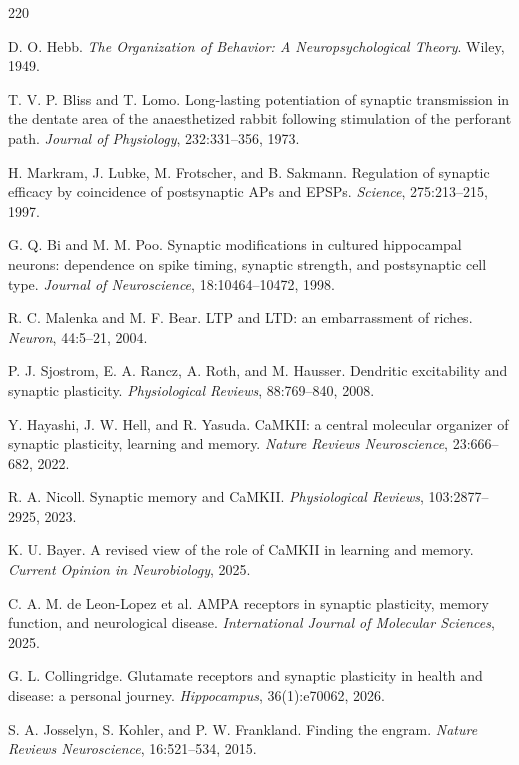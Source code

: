 \documentclass[11pt]{article}
\newcommand{\1}{\mathbf{1}}
\begin{document}
\newpage
\begin{thebibliography}{220}

D. O. Hebb. \emph{The Organization of Behavior: A Neuropsychological Theory}. Wiley, 1949.

T. V. P. Bliss and T. Lomo. Long-lasting potentiation of synaptic transmission in the dentate area of the anaesthetized rabbit following stimulation of the perforant path. \emph{Journal of Physiology}, 232:331--356, 1973.

H. Markram, J. Lubke, M. Frotscher, and B. Sakmann. Regulation of synaptic efficacy by coincidence of postsynaptic APs and EPSPs. \emph{Science}, 275:213--215, 1997.

G. Q. Bi and M. M. Poo. Synaptic modifications in cultured hippocampal neurons: dependence on spike timing, synaptic strength, and postsynaptic cell type. \emph{Journal of Neuroscience}, 18:10464--10472, 1998.

R. C. Malenka and M. F. Bear. LTP and LTD: an embarrassment of riches. \emph{Neuron}, 44:5--21, 2004.

P. J. Sjostrom, E. A. Rancz, A. Roth, and M. Hausser. Dendritic excitability and synaptic plasticity. \emph{Physiological Reviews}, 88:769--840, 2008.

Y. Hayashi, J. W. Hell, and R. Yasuda. CaMKII: a central molecular organizer of synaptic plasticity, learning and memory. \emph{Nature Reviews Neuroscience}, 23:666--682, 2022.

R. A. Nicoll. Synaptic memory and CaMKII. \emph{Physiological Reviews}, 103:2877--2925, 2023.

K. U. Bayer. A revised view of the role of CaMKII in learning and memory. \emph{Current Opinion in Neurobiology}, 2025.

C. A. M. de Leon-Lopez et al. AMPA receptors in synaptic plasticity, memory function, and neurological disease. \emph{International Journal of Molecular Sciences}, 2025.

G. L. Collingridge. Glutamate receptors and synaptic plasticity in health and disease: a personal journey. \emph{Hippocampus}, 36(1):e70062, 2026.

S. A. Josselyn, S. Kohler, and P. W. Frankland. Finding the engram. \emph{Nature Reviews Neuroscience}, 16:521--534, 2015.


\end{thebibliography}
\end{document}
